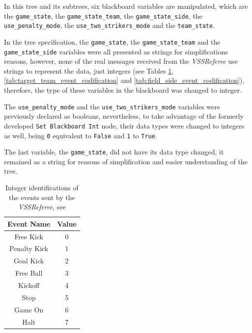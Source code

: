 In this tree and its subtrees, six blackboard variables are manipulated, which are the \texttt{game\_state}, the \texttt{game\_state\_team}, the \texttt{game\_state\_side}, the \texttt{use\_penalty\_mode}, the \texttt{use\_two\_strikers\_mode} and the \texttt{team\_state}.

In the tree specification, the \texttt{game\_state}, the \texttt{game\_state\_team} and the \texttt{game\_state\_side} variables were all presented as strings for simplifications reasons, however, none of the real messages received from the \textit{VSSReferee} use strings to represent the data, just integers (see Tables \ref{tab:referee_events_ids}, \ref{tab:target_team_event_codification} and \ref{tab:field_side_event_codification}), therefore, the type of these variables in the blackboard was changed to integer.

The \texttt{use\_penalty\_mode} and the \texttt{use\_two\_strikers\_mode} variables were previously declared as booleans, nevertheless, to take advantage of the formerly developed \texttt{Set Blackboard Int} node, their data types were changed to integers as well, being \texttt{0} equivalent to \texttt{False} and \texttt{1} to \texttt{True}.

The last variable, the \texttt{game\_state}, did not have its data type changed, it remained as a string for reasons of simplification and easier understanding of the tree.

\begin{table}[!htbp]
    \centering
    \begin{tabular}{c c}
        \toprule
        Event Name   & Value \\
        \midrule
        Free Kick    & 0     \\
        Penalty Kick & 1     \\
        Goal Kick    & 2     \\
        Free Ball    & 3     \\
        Kickoff      & 4     \\
        Stop         & 5     \\
        Game On      & 6     \\
        Halt         & 7     \\
        \bottomrule
    \end{tabular}
    \caption{Integer identifications of the events sent by the \textit{VSSReferee}, see \cite{VSSProto}}
    \label{tab:referee_events_ids}
\end{table}


